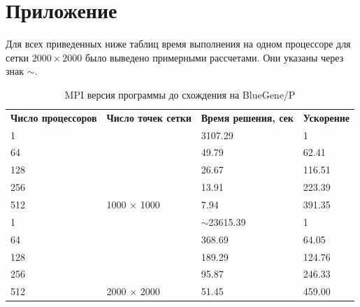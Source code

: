 \documentclass[12pt, a4paper]{article}
\begin{document}
    \section{Приложение}\label{sec:appdx}
        Для всех приведенных ниже таблиц время выполнения на одном процессоре для сетки $2000 \times 2000$ было выведено примерными рассчетами. Они указаны через знак $\sim$.
        \begin{table}[H]
            \centering
            \caption{MPI версия программы до схождения на BlueGene/P}
            \label{tab:bg_mpi_full}
            \begin{tabular}{llll}
            \rowcolor[HTML]{C0C0C0}
            \textbf{Число процессоров} & \textbf{Число точек сетки}                   & \textbf{Время решения, сек} & \textbf{Ускорение} \\
            \rowcolor[HTML]{EFEFEF}
            1                          & \multicolumn{1}{c}{\cellcolor[HTML]{EFEFEF}} & 3107.29                     & 1                  \\
            64                         &                                              & 49.79                       & 62.41              \\
            128                        &                                              & 26.67                       & 116.51             \\
            256                        &                                              & 13.91                       & 223.39             \\
            512                        & \multirow{-4}{*}{1000 $\times$ 1000}         & 7.94                        & 391.35             \\
            \rowcolor[HTML]{EFEFEF}
            1                          &                                              & $\sim$23615.39              & 1                  \\
            64                         &                                              & 368.69                      & 64.05              \\
            128                        &                                              & 189.29                      & 124.76             \\
            256                        &                                              & 95.87                       & 246.33             \\
            512                        & \multirow{-4}{*}{2000 $\times$ 2000}         & 51.45                       & 459.00
            \end{tabular}
        \end{table}
\end{document}

